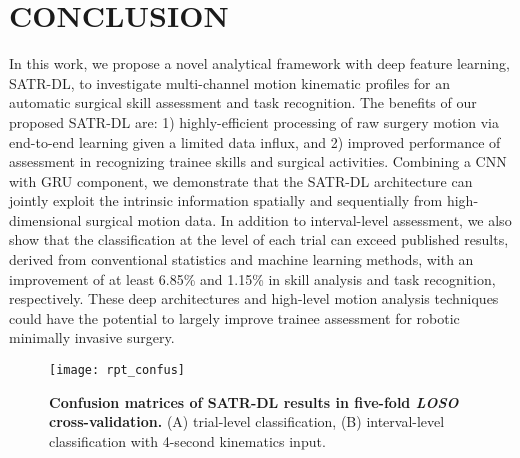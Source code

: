 \documentclass[letterpaper, 10 pt, conference, twoside]{IEEEtran}
\begin{document}
\section{CONCLUSION}
In this work, we propose a novel analytical framework with deep feature learning, SATR-DL, to investigate multi-channel motion kinematic profiles for an automatic surgical skill assessment and task recognition. The benefits of our proposed SATR-DL are: 1) highly-efficient processing of raw surgery motion via end-to-end learning given a limited data influx, and 2) improved performance of assessment in recognizing trainee skills and surgical activities.
Combining a CNN with GRU component, we demonstrate that the SATR-DL architecture can jointly exploit the intrinsic information spatially and sequentially from high-dimensional surgical motion data. In addition to interval-level assessment, we also show that the classification at the level of each trial can exceed published results, derived from conventional statistics and machine learning methods, with an improvement of at least 6.85\% and 1.15\% in skill analysis and task recognition, respectively.
These deep architectures and high-level motion analysis techniques could have the potential to largely improve trainee assessment for robotic minimally invasive surgery. 

\begin{figure}[tb]
      \centering
      \texttt{[image: rpt\_confus]}
      \caption{ {\bf 
      Confusion matrices of SATR-DL results in five-fold \textit{LOSO} cross-validation.} (A) trial-level classification, (B) interval-level classification with 4-second kinematics input. 
      }
      \label{fig: confusion}
\vspace{-0.5cm}
\end{figure}
\end{document}

